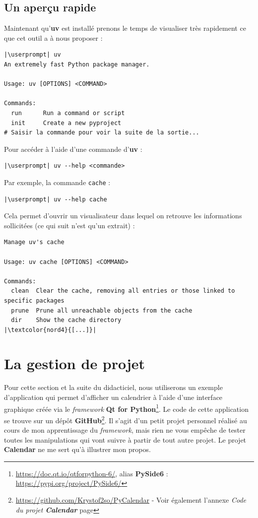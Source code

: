\subsection*{Un aperçu rapide}
Maintenant qu'\textbf{uv} est installé prenons le temps de visualiser très rapidement ce que cet outil a à nous proposer :
\begin{lstlisting}[style=bash]
|\userprompt| uv
An extremely fast Python package manager.

Usage: uv [OPTIONS] <COMMAND>

Commands:
  run      Run a command or script
  init     Create a new pyproject
# Saisir la commande pour voir la suite de la sortie...
\end{lstlisting}

Pour accéder à l'aide d'une commande d'\textbf{uv} :
\begin{lstlisting}[style=bash]
|\userprompt| uv --help <commande>
\end{lstlisting}

Par exemple, la commande \texttt{cache} :
\begin{lstlisting}[style=bash]
|\userprompt| uv --help cache
\end{lstlisting}

Cela permet d'ouvrir un visualisateur dans lequel on retrouve les informations sollicitées (ce qui suit n'est qu'un extrait) :
\begin{lstlisting}[style=visual]
Manage uv's cache

Usage: uv cache [OPTIONS] <COMMAND>

Commands:
  clean  Clear the cache, removing all entries or those linked to specific packages
  prune  Prune all unreachable objects from the cache
  dir    Show the cache directory
|\textcolor{nord4}{[...]}|
\end{lstlisting}

\section{La gestion de projet}

Pour cette section et la suite du didacticiel, nous utiliserons un exemple d'application qui permet d'afficher un calendrier à l'aide d'une interface graphique créée via le \textit{framework} \textbf{Qt for Python}\footnote{\url{https://doc.qt.io/qtforpython-6/}, alias \textbf{PySide6} : \url{https://pypi.org/project/PySide6/}}. Le code de cette application se trouve sur un dépôt \textbf{GitHub}\footnote{\url{https://github.com/Krystof2so/PyCalendar} - Voir également l'annexe \textit{Code du projet \textbf{Calendar}} page \pageref{code_calendar}}. Il s'agit d'un petit projet personnel réalisé au cours de mon apprentissage du \textit{framework}, mais rien ne vous empêche de tester toutes les manipulations qui vont suivre à partir de tout autre projet. Le projet \textbf{Calendar} ne me sert qu'à illustrer mon propos.

